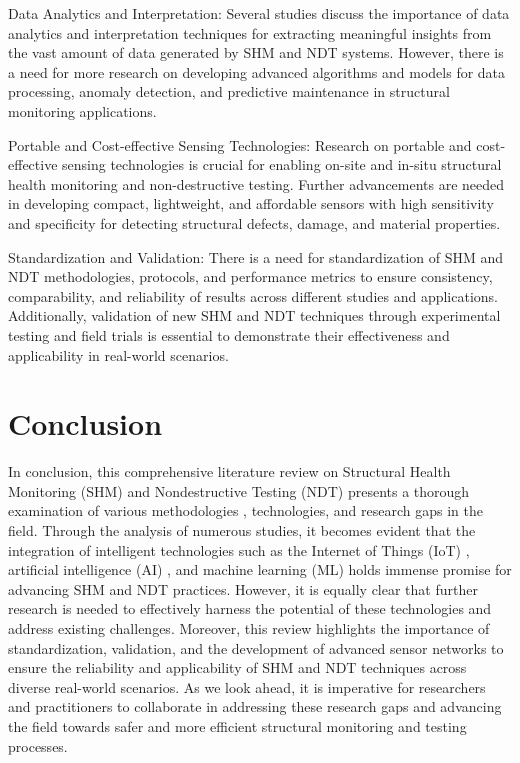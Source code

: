 \documentclass[journal, a4paper]{IEEEtran}
\begin{document}
Data Analytics and Interpretation: Several studies discuss the importance of data analytics and interpretation techniques for extracting meaningful insights from the vast amount of data generated by SHM and NDT systems. However, there is a need for more research on developing advanced algorithms and models for data processing, anomaly detection, and predictive maintenance in structural monitoring applications. 

Portable and Cost-effective Sensing Technologies: Research on portable and cost-effective sensing technologies is crucial for enabling on-site and in-situ structural health monitoring and non-destructive testing. Further advancements are needed in developing compact, lightweight, and affordable sensors with high sensitivity and specificity for detecting structural defects, damage, and material properties. 

Standardization and Validation: There is a need for standardization of SHM and NDT methodologies, protocols, and performance metrics to ensure consistency, comparability, and reliability of results across different studies and applications. Additionally, validation of new SHM and NDT techniques through experimental testing and field trials is essential to demonstrate their effectiveness and applicability in real-world scenarios. 














\section{Conclusion}
In conclusion, this comprehensive literature review on Structural Health Monitoring (SHM)
and Nondestructive Testing (NDT) presents a thorough examination of various
methodologies \cite{de_menezes_defect_2021} \cite{tang_explainable_2023} \cite{wu_internal_2024} \cite{zhang_spatial_2023} \cite{zhang_structural_2021},
technologies, and research gaps in the field. Through the analysis of numerous studies,
it becomes evident that the integration of intelligent technologies such as the
Internet of Things (IoT) \cite{rehman_advancing_2024},
artificial intelligence (AI) \cite{moradi_intelligent_2023},
and machine learning (ML) holds immense promise for advancing SHM and NDT practices.
However, it is equally clear that further research is needed to effectively harness the potential of these technologies
and address existing challenges. Moreover, this review highlights the importance of standardization, validation,
and the development of advanced sensor networks to ensure the reliability and applicability of SHM and NDT
techniques across diverse real-world scenarios. As we look ahead, it is imperative for researchers and practitioners
to collaborate in addressing these research gaps and advancing the field towards safer and more efficient structural
monitoring and testing processes.




\ifCLASSOPTIONcaptionsoff
  \newpage
\fi






\end{document}
